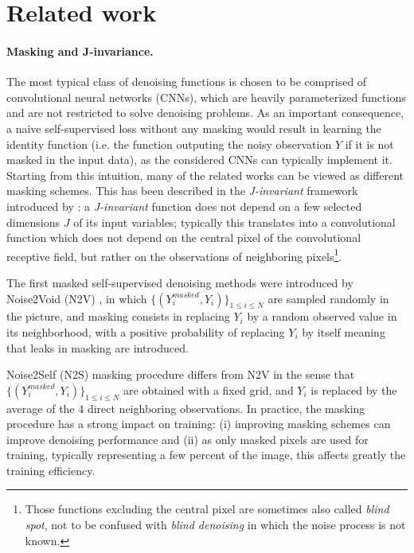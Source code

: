 \documentclass{article}
\begin{document}
\section{Related work}
\label{sec:related}
\paragraph{Masking and J-invariance.}
The most typical class of denoising functions is chosen to be comprised of convolutional neural networks (CNNs), which are heavily parameterized functions and are not restricted to solve denoising problems. As an important consequence, a naive self-supervised loss without any masking would result in learning the identity function (i.e. the function outputing the noisy observation $Y$ if it is not masked in the input data), as the considered CNNs can typically implement it. Starting from this intuition, many of the related works can be viewed as different masking schemes. This has been described in the \textit{J-invariant} framework introduced by \cite{batson2019noise2self}: a \textit{J-invariant} function does not depend on a few selected dimensions $J$ of its input variables; typically this translates into a convolutional function which does not depend on the central pixel of the convolutional receptive field, but rather on the observations of neighboring pixels\footnote{Those functions excluding the central pixel are sometimes also called \textit{blind spot}, not to be confused with \textit{blind denoising} in which the noise process is not known.}.

The first masked self-supervised denoising methods were introduced by Noise2Void (N2V) \cite{krull2018noise2void}, in which $\{(Y^{masked}_i,Y_i)\}_{1\leqslant i\leqslant N}$ are sampled randomly in the picture, and masking consists in replacing $Y_i$ by a random observed value in its neighborhood, with a positive probability of replacing $Y_i$ by itself meaning that leaks in masking are introduced.

Noise2Self (N2S) \cite{batson2019noise2self} masking procedure differs from N2V in the sense that $\{(Y^{masked}_i,Y_i)\}_{1\leqslant i\leqslant N}$ are obtained with a fixed grid, and $Y_i$ is replaced by the average of the 4 direct neighboring observations.
In practice, the masking procedure has a strong impact on training: (i) improving masking schemes can improve denoising performance and (ii) as only masked pixels are used for training, typically representing a few percent of the image, this affects greatly the training efficiency.
\end{document}
